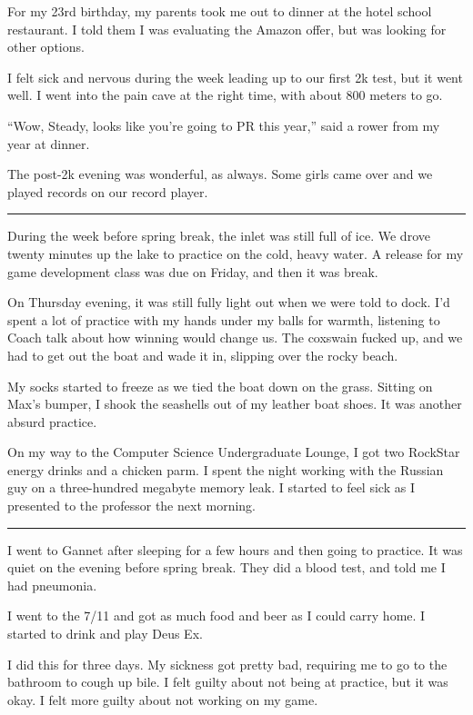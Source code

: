 For my 23rd birthday, my parents took me out to dinner at the hotel school
restaurant.  I told them I was evaluating the Amazon offer, but was looking for
other options.

I felt sick and nervous during the week leading up to our first 2k test, but it
went well.  I went into the pain cave at the right time, with about 800 meters
to go.  

``Wow, Steady, looks like you're going to PR this year,'' said a rower from my
year at dinner.  

The post-2k evening was wonderful, as always.  Some girls came over and we
played records on our record player.  

\plainfancybreak{12pt}{2}{}

During the week before spring break, the inlet was still full of ice.  We drove
twenty minutes up the lake to practice on the cold, heavy water.  A release for
my game development class was due on Friday, and then it was break.

On Thursday evening, it was still fully light out when we were told to dock.
I'd spent a lot of practice with my hands under my balls for warmth, listening
to Coach talk about how winning would change us.   The coxswain fucked up, and
we had to get out the boat and wade it in, slipping over the rocky beach. 

My socks started to freeze as we tied the boat down on the grass.  Sitting on
Max's bumper, I shook the seashells out of my leather boat shoes.  It was
another absurd practice.  

On my way to the Computer Science Undergraduate Lounge, I got two RockStar
energy drinks and a chicken parm.  I spent the night working with the Russian
guy on a three-hundred megabyte memory leak.  I started to feel sick as I
presented to the professor the next morning.

\plainfancybreak{12pt}{2}{}

I went to Gannet after sleeping for a few hours and then going to practice.  It
was quiet on the evening before spring break.  They did a blood test, and told
me I had pneumonia.

I went to the 7/11 and got as much food and beer as I could carry home.  I
started to drink and play Deus Ex.  

I did this for three days.  My sickness got pretty bad, requiring me to go to
the bathroom to cough up bile.  I felt guilty about not being at practice, but
it was okay.  I felt more guilty about not working on my game. 
 
